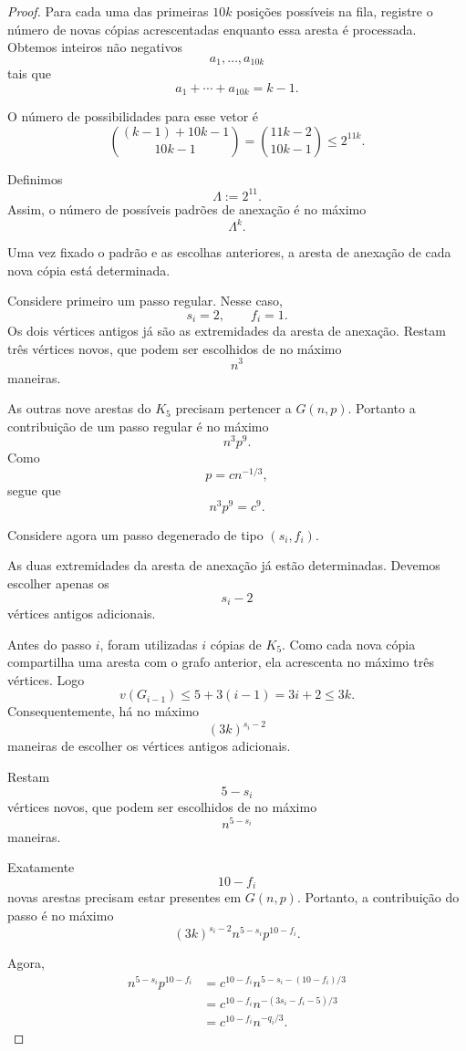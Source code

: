\documentclass[reqno, 12pt]{amsart}
\numberwithin{equation}{section}
\theoremstyle{plain}
\theoremstyle{definition}
\begin{document}
\begin{proof}
  Para cada uma das primeiras $10k$ posições possíveis na fila,
  registre o número de novas cópias acrescentadas enquanto essa aresta
  é processada. Obtemos inteiros não negativos
  \[
    a_1,\ldots,a_{10k}
  \]
  tais que
  \[
    a_1+\cdots+a_{10k}=k-1.
  \]

  O número de possibilidades para esse vetor é
  \[
    \binom{(k-1)+10k-1}{10k-1}
    =
    \binom{11k-2}{10k-1}
    \le
    2^{11k}.
  \]

  Definimos
  \[
    \Lambda:=2^{11}.
  \]
  Assim, o número de possíveis padrões de anexação é no máximo
  \[
    \Lambda^k.
    \tag{3}\label{3}
  \]

  Uma vez fixado o padrão e as escolhas anteriores, a aresta de
  anexação de cada nova cópia está determinada.

  Considere primeiro um passo regular. Nesse caso,
  \[
    s_i=2,
    \qquad
    f_i=1.
  \]
  Os dois vértices antigos já são as extremidades da aresta de
  anexação. Restam três vértices novos, que podem ser escolhidos de no
  máximo
  \[
    n^3
  \]
  maneiras.

  As outras nove arestas do $K_5$ precisam pertencer a $G(n,p)$.
  Portanto a contribuição de um passo regular é no máximo
  \[
    n^3p^9.
  \]
  Como
  \[
    p=cn^{-1/3},
  \]
  segue que
  \[
    n^3p^9=c^9.
    \tag{4}\label{4}
  \]

  Considere agora um passo degenerado de tipo $(s_i,f_i)$.

  As duas extremidades da aresta de anexação já estão determinadas.
  Devemos escolher apenas os
  \[
    s_i-2
  \]
  vértices antigos adicionais.

  Antes do passo $i$, foram utilizadas $i$ cópias de $K_5$. Como cada
  nova cópia compartilha uma aresta com o grafo anterior, ela acrescenta
  no máximo três vértices. Logo
  \[
    v(G_{i-1})
    \le
    5+3(i-1)
    =
    3i+2
    \le
    3k.
  \]
  Consequentemente, há no máximo
  \[
    (3k)^{s_i-2}
  \]
  maneiras de escolher os vértices antigos adicionais.

  Restam
  \[
    5-s_i
  \]
  vértices novos, que podem ser escolhidos de no máximo
  \[
    n^{5-s_i}
  \]
  maneiras.

  Exatamente
  \[
    10-f_i
  \]
  novas arestas precisam estar presentes em $G(n,p)$. Portanto, a
  contribuição do passo é no máximo
  \[
    (3k)^{s_i-2}
    n^{5-s_i}
    p^{10-f_i}.
    \tag{5}\label{5}
  \]

  Agora,
  \[
    \begin{aligned}
      n^{5-s_i}p^{10-f_i}
       & =
      c^{10-f_i}
      n^{5-s_i-(10-f_i)/3} \\
       & =
      c^{10-f_i}
      n^{-(3s_i-f_i-5)/3}  \\
       & =
      c^{10-f_i}n^{-q_i/3}.
    \end{aligned}
    \tag{6}\label{6}
  \]


\end{proof}
\end{document}
